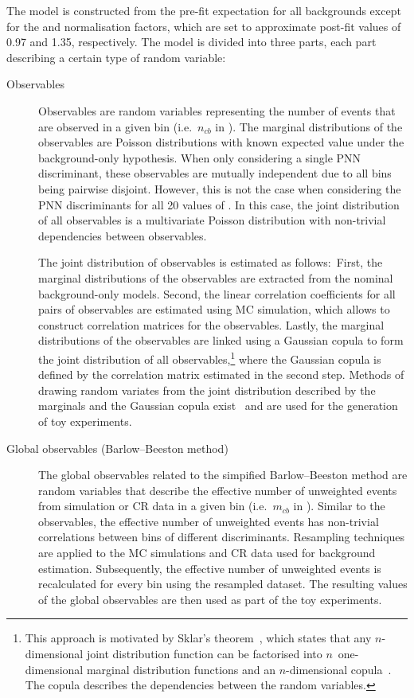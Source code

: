 The model is constructed from the pre-fit expectation for all backgrounds except
for the \ttbar and \ZHF normalisation factors, which are set to approximate
post-fit values of 0.97 and 1.35, respectively. The model is divided into three
parts, each part describing a certain type of random variable:
\begin{description}

\item[Observables] Observables are random variables representing the number of
  events that are observed in a given bin (i.e.~$n_{cb}$ in
  ). The marginal distributions of the
  observables are Poisson distributions with known expected value under the
  background-only hypothesis. When only considering a single PNN discriminant,
  these observables are mutually independent due to all bins being pairwise
  disjoint. However, this is not the case when considering the PNN discriminants
  for all 20 values of \mX. In this case, the joint distribution of all
  observables is a multivariate Poisson distribution with non-trivial
  dependencies between observables.

  The joint distribution of observables is estimated as follows:~First, the
  marginal distributions of the observables are extracted from the nominal
  background-only models. Second, the linear correlation coefficients for all
  pairs of observables are estimated using MC simulation, which allows to
  construct correlation matrices for the observables. Lastly, the marginal
  distributions of the observables are linked using a Gaussian copula to form
  the joint distribution of all observables,\footnote{This approach is motivated
    by Sklar's theorem~\cite{Sklar1959FonctionsDR}, which states that any
    $n$-dimensional joint distribution function can be factorised into
    $n$~one-dimensional marginal distribution functions and an $n$-dimensional
    copula~\cite{nelsen}. The copula describes the dependencies between the
    random variables.} where the Gaussian copula is defined by the correlation
  matrix estimated in the second step. Methods of drawing random variates from
  the joint distribution described by the marginals and the Gaussian copula
  exist~\cite{nelsen} and are used for the generation of toy experiments.

\item[Global observables (Barlow--Beeston method)] The global observables
  related to the simpified Barlow--Beeston method are random variables that
  describe the effective number of unweighted events from simulation or CR data
  in a given bin (i.e.~$m_{cb}$ in
  ). Similar to the observables, the
  effective number of unweighted events has non-trivial correlations between
  bins of different discriminants. Resampling techniques are applied to the MC
  simulations and CR data used for background estimation. Subsequently, the
  effective number of unweighted events is recalculated for every bin using the
  resampled dataset. The resulting values of the global observables are then
  used as part of the toy experiments.


\end{description}

